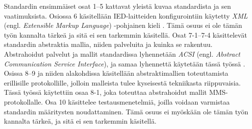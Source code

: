 Standardin ensimmäiset osat 1--5 kattavat yleistä kuvaa standardista ja sen vaatimuksista. Osiossa 6 käsitellään IED-laitteiden konfigurointiin käytetty \emph{XML} (engl. \emph{Extensible Markup Language}) -pohjainen kieli \mbox{\cite[s.~7--8]{IEC61850-6}}. Tämä osuus ei ole tämän työn kannalta tärkeä ja sitä ei sen tarkemmin käsitellä. Osat 7-1--7-4 käsittelevät standardin abstraktia mallia, niiden palveluita ja kuinka se rakentuu. Abstrahoidut palvelut ja mallit standardissa lyhennetään \emph{ACSI} (engl. \emph{Abstract Communication Service Interface}), ja samaa lyhennettä käytetään tässä työssä \mbox{\cite[s.~72]{IEC61850-7-1}}. Osissa 8--9 ja niiden alakohdissa käsitellään abstraktimallien toteuttamista erillisille protokollille, jolloin malleista tulee kyseisestä tekniikasta riippuvaisia. Tässä työssä käytettiin osaa 8-1, joka toteuttaa abstrahoidut mallit MMS-protokollalle. Osa 10 käsittelee testausmenetelmiä, joilla voidaan varmistaa standardin määritysten noudattaminen. Tämä osuus ei myöskään ole tämän työn kannalta tärkeä, ja sitä ei sen tarkemmin käsitellä. \mbox{\cite[s.~15]{IEC61850-7-1}}


